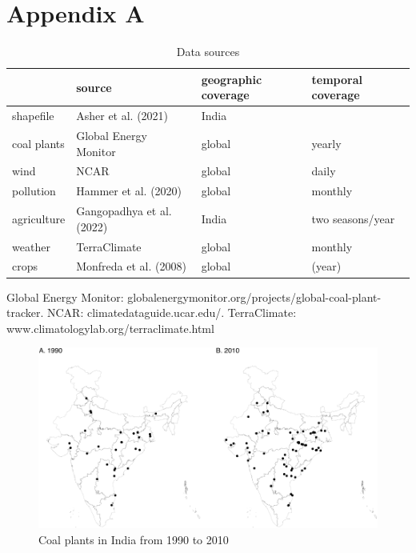\documentclass[
]{article}
\newcommand{\beginappendix}{ \setcounter{table}{0} \renewcommand{\thetable}{A\arabic{table}} \setcounter{figure}{0} \renewcommand{\thefigure}{A\arabic{figure}} }
\begin{document}
\FloatBarrier
\newpage

\hypertarget{appendix-a}{%
\section*{Appendix A}\label{appendix-a}}

\beginappendix
\FloatBarrier

\begin{table}[H]

\caption{\label{tab:data}Data sources}
\centering
\begin{threeparttable}
\begin{tabular}[t]{>{\raggedright\arraybackslash}p{2cm}>{\centering\arraybackslash}p{5cm}>{\centering\arraybackslash}p{3cm}>{\centering\arraybackslash}p{3cm}}
\toprule
  & source & geographic coverage & temporal coverage\\
\midrule
shapefile & Asher et al. (2021) & India & \\
coal plants & Global Energy Monitor & global & yearly\\
wind & NCAR & global & daily\\
pollution & Hammer et al. (2020) & global & monthly\\
agriculture & Gangopadhya et al. (2022) & India & two seasons/year\\
weather & TerraClimate & global & monthly\\
crops & Monfreda et al. (2008) & global & 2000 (year)\\
\bottomrule
\end{tabular}
\begin{tablenotes}[para]
\item Global Energy Monitor: globalenergymonitor.org/projects/global-coal-plant-tracker. NCAR: climatedataguide.ucar.edu/. TerraClimate: www.climatologylab.org/terraclimate.html
\end{tablenotes}
\end{threeparttable}
\end{table}

\FloatBarrier
\newpage

\begin{figure}
\includegraphics{draft_files/figure-latex/plants-1} \caption[Coal plants in India from 1990 to 2010]{Coal plants in India from 1990 to 2010}\label{fig:plants}
\end{figure}
\end{document}
